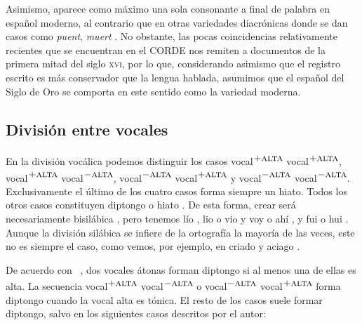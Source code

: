 Asimismo, aparece como máximo una sola consonante a final de palabra en español moderno, al contrario que en otras variedades diacrónicas donde se dan casos como \textit{puent}, \textit{muert} \parencite[49]{navarrotomas1946}. No obstante, las pocas coincidencias relativamente recientes que se encuentran en el CORDE  nos remiten a documentos de la primera mitad del siglo \textsc{xvi}, por lo que, considerando asimismo que el registro escrito es más conservador que la lengua hablada, asumimos que el español del Siglo de Oro se comporta en este sentido como la variedad moderna.

\subsection{División entre vocales}\label{sec:irregularidades}
En la división vocálica podemos distinguir los casos vocal\textsuperscript{$+\textsc{alta}$} vocal\textsuperscript{$+\textsc{alta}$}, vocal\textsuperscript{$+\textsc{alta}$} vocal\textsuperscript{$-\textsc{alta}$}, vocal\textsuperscript{$-\textsc{alta}$} vocal\textsuperscript{$+\textsc{alta}$} y vocal\textsuperscript{$-\textsc{alta}$} vocal\textsuperscript{$-\textsc{alta}$}. Exclusivamente el último de los cuatro casos forma siempre un hiato. Todos los otros casos constituyen diptongo o hiato \parencite{riosmestre1999}. De esta forma, \textlangle{}crear\textrangle{} será necesariamente bisilábica , pero tenemos \textlangle{}lío\textrangle{}  \ipa{[ˈli.o]},
\textlangle{}lio\textrangle{}  \ipa{[liˈo]} o \textlangle{}vio\textrangle{}  \ipa{[Bjo]} 
y \textlangle{}voy\textrangle{}  \ipa{[ai̯]} o \textlangle{}ahí\textrangle{}  \ipa{[a.ˈi]}, y \textlangle{}fui\textrangle{}  \ipa{[fwi]} o \textlangle{}hui\textrangle{}  \ipa{[/u.ˈi/]}. Aunque la división silábica se infiere de la ortografía la mayoría de las veces, este no es siempre el caso, como vemos, por ejemplo, en \textlangle{}criado\textrangle{}  \textipa{[kRi.ˈa.ðo]} y \textlangle{}aciago\textrangle{}  \textipa{[a.ˈTja.Go]}.

De acuerdo con \citeauthor{quilis2019}~\parencite*[184-186]{quilis2019}, dos vocales átonas forman diptongo si al menos una de ellas es alta. La secuencia vocal\textsuperscript{$+\textsc{alta}$} vocal\textsuperscript{$-\textsc{alta}$} o vocal\textsuperscript{$-\textsc{alta}$} vocal\textsuperscript{$+\textsc{alta}$} forma diptongo cuando la vocal alta es tónica. El resto de los casos suele formar diptongo, salvo en los siguientes casos descritos por el autor:

